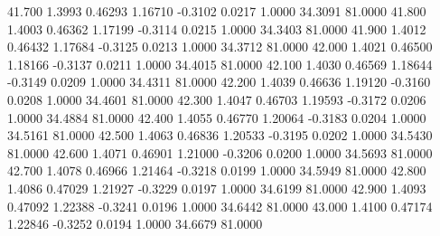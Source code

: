   41.700   1.3993   0.46293   1.16710  -0.3102   0.0217   1.0000  34.3091  81.0000
  41.800   1.4003   0.46362   1.17199  -0.3114   0.0215   1.0000  34.3403  81.0000
  41.900   1.4012   0.46432   1.17684  -0.3125   0.0213   1.0000  34.3712  81.0000
  42.000   1.4021   0.46500   1.18166  -0.3137   0.0211   1.0000  34.4015  81.0000
  42.100   1.4030   0.46569   1.18644  -0.3149   0.0209   1.0000  34.4311  81.0000
  42.200   1.4039   0.46636   1.19120  -0.3160   0.0208   1.0000  34.4601  81.0000
  42.300   1.4047   0.46703   1.19593  -0.3172   0.0206   1.0000  34.4884  81.0000
  42.400   1.4055   0.46770   1.20064  -0.3183   0.0204   1.0000  34.5161  81.0000
  42.500   1.4063   0.46836   1.20533  -0.3195   0.0202   1.0000  34.5430  81.0000
  42.600   1.4071   0.46901   1.21000  -0.3206   0.0200   1.0000  34.5693  81.0000
  42.700   1.4078   0.46966   1.21464  -0.3218   0.0199   1.0000  34.5949  81.0000
  42.800   1.4086   0.47029   1.21927  -0.3229   0.0197   1.0000  34.6199  81.0000
  42.900   1.4093   0.47092   1.22388  -0.3241   0.0196   1.0000  34.6442  81.0000
  43.000   1.4100   0.47174   1.22846  -0.3252   0.0194   1.0000  34.6679  81.0000
